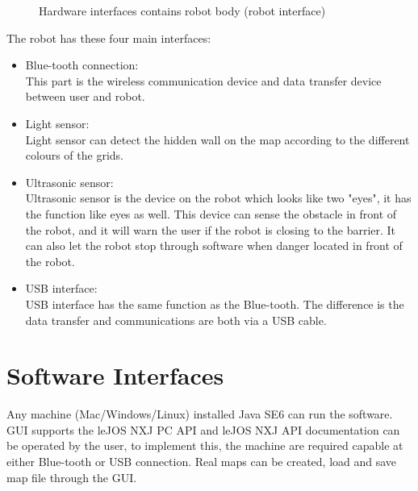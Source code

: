 \documentclass[11pt, a4paper]{report}
\begin{document}
\begin{figure}[ht]
\centering
\setlength\fboxsep{2pt}
\setlength\fboxrule{0.2pt}
\caption{Hardware interfaces contains robot body (robot interface)}
\label{sec:GUI}
\label{fig:GUI}
\end{figure}

The robot has these four main interfaces:
\begin{itemize}
	\item{Blue-tooth connection:}\\
	This part is the wireless communication device and data transfer device between user and robot. 
	\item{Light sensor:}\\
	Light sensor can detect the hidden wall on the map according to the different colours of the grids.
	\item{Ultrasonic sensor:}\\
	Ultrasonic sensor is the device on the robot which looks like two "eyes", it has the function like eyes as well. This device can sense the obstacle in front of the robot, and it will warn the user if the robot is closing to the barrier. It can also let the robot stop through software when danger located in front of the robot.
	\item{USB interface:}\\
	USB interface has the same function as the Blue-tooth. The difference is the data transfer and communications are both via a USB cable.
\end{itemize}
\pagebreak
\section{Software Interfaces}
Any machine (Mac/Windows/Linux) installed Java SE6 can run the software. GUI supports the leJOS NXJ PC API and leJOS NXJ API documentation can be operated by the user, to implement this, the machine are required capable at either Blue-tooth or USB connection. Real maps can be created, load and save map file through the GUI.
\end{document}

